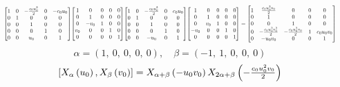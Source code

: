\documentclass[11pt]{article}
\theoremstyle{definition}
\begin{document}
\[
\scaletoalign{\textwidth}{{\left[\begin{matrix}1 & 0 & - \frac{c_{0} u_{0}^{2}}{2} & 0 & - c_{0} u_{0}\\0 & 1 & 0 & 0 & 0\\0 & 0 & 1 & 0 & 0\\0 & 0 & 0 & 1 & 0\\0 & 0 & u_{0} & 0 & 1\end{matrix}\right]} {\left[\begin{matrix}1 & 0 & 0 & 0 & 0\\0 & 1 & 0 & 0 & 0\\0 & - v_{0} & 1 & 0 & 0\\v_{0} & 0 & 0 & 1 & 0\\0 & 0 & 0 & 0 & 1\end{matrix}\right]} {\left[\begin{matrix}1 & 0 & - \frac{c_{0} u_{0}^{2}}{2} & 0 & c_{0} u_{0}\\0 & 1 & 0 & 0 & 0\\0 & 0 & 1 & 0 & 0\\0 & 0 & 0 & 1 & 0\\0 & 0 & - u_{0} & 0 & 1\end{matrix}\right]} {\left[\begin{matrix}1 & 0 & 0 & 0 & 0\\0 & 1 & 0 & 0 & 0\\0 & v_{0} & 1 & 0 & 0\\- v_{0} & 0 & 0 & 1 & 0\\0 & 0 & 0 & 0 & 1\end{matrix}\right]} = {\left[\begin{matrix}1 & \frac{c_{0} u_{0}^{2} v_{0}}{2} & 0 & 0 & 0\\0 & 1 & 0 & 0 & 0\\0 & 0 & 1 & 0 & 0\\0 & - \frac{c_{0} u_{0}^{2} v_{0}^{2}}{2} & - \frac{c_{0} u_{0}^{2} v_{0}}{2} & 1 & c_{0} u_{0} v_{0}\\0 & - u_{0} v_{0} & 0 & 0 & 1\end{matrix}\right]}}
\]
\[
\alpha = \left( 1, \  0, \  0, \  0, \  0\right), \quad \beta = \left( -1, \  1, \  0, \  0, \  0\right)
\]
\[
\scaletoalign{\textwidth}{\left[ X_{\alpha}\left(u_{0}\right), X_{\beta}\left(v_{0}\right) \right] = X_{\alpha + \beta}\left(- u_{0} v_{0}\right) X_{2\alpha + \beta}\left(- \frac{c_{0} u_{0}^{2} v_{0}}{2}\right)}
\]
\end{document}
